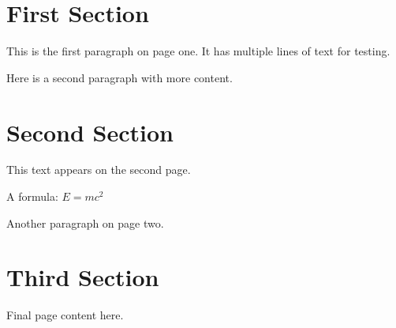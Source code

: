 \documentclass[12pt]{article}
\begin{document}
\section{First Section}

This is the first paragraph on page one.
It has multiple lines of text for testing.

Here is a second paragraph with more content.

\newpage

\section{Second Section}

This text appears on the second page.

A formula: $E = mc^2$

Another paragraph on page two.

\newpage

\section{Third Section}

Final page content here.
\end{document}
